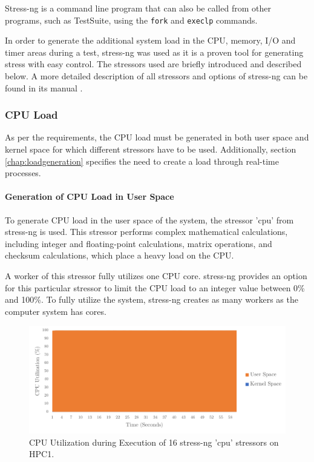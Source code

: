 Stress-ng is a command line program that can also be called from other programs, such as TestSuite, using the \texttt{fork} \cite{stress04} and \texttt{execlp} \cite{stress05} commands.

In order to generate the additional system load in the CPU, memory, I/O and timer areas during a test, stress-ng was used as it is a proven tool for generating stress with easy control. The stressors used are briefly introduced and described below. A more detailed description of all stressors and options of stress-ng can be found in its manual \cite{stress03}.

\subsubsection{CPU Load} \label{chap:stressngCPU}
As per the requirements, the CPU load must be generated in both user space and kernel space for which different stressors have to be used. Additionally, section \ref{chap:loadgeneration} specifies the need to create a load through real-time processes.

\paragraph{Generation of CPU Load in User Space} \label{chap:CPUStressor}
To generate CPU load in the user space of the system, the stressor 'cpu' from stress-ng is used. This stressor performs complex mathematical calculations, including integer and floating-point calculations, matrix operations, and checksum calculations, which place a heavy load on the CPU.

A worker of this stressor fully utilizes one CPU core. stress-ng provides an option for this particular stressor to limit the CPU load to an integer value between 0\% and 100\%. To fully utilize the system, stress-ng creates as many workers as the computer system has cores.

\begin{figure}[h!]
    \centering
    \includegraphics[width=1\linewidth]{figures/method/stress1.pdf}
    \caption{CPU Utilization during Execution of 16 stress-ng 'cpu' stressors on HPC1.}
    \label{fig:stressCPU}
\end{figure}

